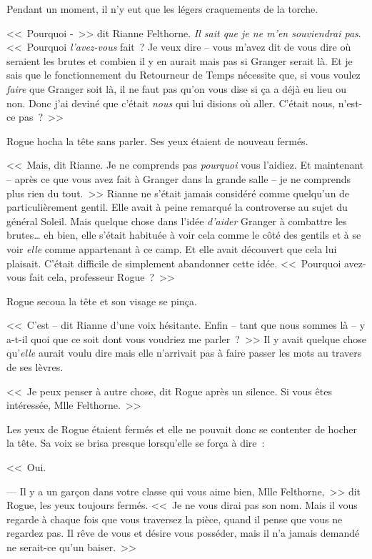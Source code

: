 Pendant un moment, il n'y eut que les légers craquements de la torche.

<<~Pourquoi -~>> dit Rianne Felthorne. \emph{Il sait que je ne m'en souviendrai pas}. <<~Pourquoi \emph{l'avez-vous} fait~? Je veux dire -- vous m'avez dit de vous dire où seraient les brutes et combien il y en aurait mais pas si Granger serait là. Et je sais que le fonctionnement du Retourneur de Temps nécessite que, si vous voulez \emph{faire} que Granger soit là, il ne faut pas qu'on vous dise si ça a déjà eu lieu ou non. Donc j'ai deviné que c'était \emph{nous} qui lui disions où aller. C'était nous, n'est-ce pas~?~>>

Rogue hocha la tête sans parler. Ses yeux étaient de nouveau fermés.

<<~Mais, dit Rianne. Je ne comprends pas \emph{pourquoi} vous l'aidiez. Et maintenant -- après ce que vous avez fait à Granger dans la grande salle -- je ne comprends plus rien du tout.~>> Rianne ne s'était jamais considéré comme quelqu'un de particulièrement gentil. Elle avait à peine remarqué la controverse au sujet du général Soleil. Mais quelque chose dans l'idée \emph{d'aider} Granger à combattre les brutes… eh bien, elle s'était habituée à voir cela comme le côté des gentils et à se voir \emph{elle} comme appartenant à ce camp. Et elle avait découvert que cela lui plaisait. C'était difficile de simplement abandonner cette idée. <<~Pourquoi avez-vous fait cela, professeur Rogue~?~>>

Rogue secoua la tête et son visage se pinça.

<<~C'est -- dit Rianne d'une voix hésitante. Enfin -- tant que nous sommes là -- y a-t-il quoi que ce soit dont vous voudriez me parler~?~>> Il y avait quelque chose qu'\emph{elle} aurait voulu dire mais elle n'arrivait pas à faire passer les mots au travers de ses lèvres.

<<~Je peux penser à autre chose, dit Rogue après un silence. Si vous êtes intéressée, Mlle Felthorne.~>>

Les yeux de Rogue étaient fermés et elle ne pouvait donc se contenter de hocher la tête. Sa voix se brisa presque lorsqu'elle se força à dire~:

<<~Oui.

--- Il y a un garçon dans votre classe qui vous aime bien, Mlle Felthorne,~>> dit Rogue, les yeux toujours fermés. <<~Je ne vous dirai pas son nom. Mais il vous regarde à chaque fois que vous traversez la pièce, quand il pense que vous ne regardez pas. Il rêve de vous et désire vous posséder, mais il n'a jamais demandé ne serait-ce qu'un baiser.~>>


